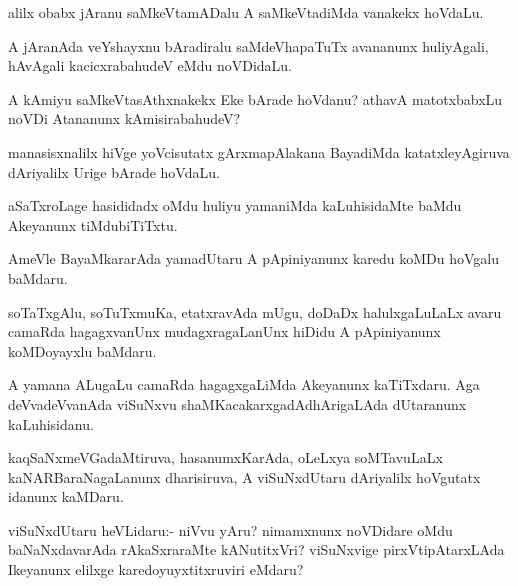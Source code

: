 \begin{mng}
alilx obabx jAranu saMkeVtamADalu A saMkeVtadiMda vanakekx hoVdaLu.
\end{mng}

\begin{mng}
A jAranAda veYshayxnu bAradiralu saMdeVhapaTuTx avananunx huliyAgali, hAvAgali kacicxrabahudeV eMdu noVDidaLu.
\end{mng}

\begin{mng}
A kAmiyu saMkeVtasAthxnakekx Eke bArade hoVdanu? athavA matotxbabxLu noVDi Atananunx kAmisirabahudeV?
\end{mng}

\begin{mng}
manasisxnalilx hiVge yoVcisutatx gArxmapAlakana BayadiMda katatxleyAgiruva dAriyalilx Urige bArade hoVdaLu.
\end{mng}

\begin{mng}
aSaTxroLage hasididadx oMdu huliyu yamaniMda kaLuhisidaMte baMdu Akeyanunx tiMdubiTiTxtu.
\end{mng}

\begin{mng}
AmeVle BayaMkararAda yamadUtaru A pApiniyanunx karedu koMDu hoVgalu baMdaru.
\end{mng}

\begin{mng}
soTaTxgAlu, soTuTxmuKa, etatxravAda mUgu, doDaDx halulxgaLuLaLx avaru camaRda hagagxvanUnx mudagxragaLanUnx hiDidu A pApiniyanunx koMDoyayxlu baMdaru.
\end{mng}

\begin{mng}
A yamana ALugaLu camaRda hagagxgaLiMda Akeyanunx kaTiTxdaru. Aga deVvadeVvanAda viSuNxvu shaMKacakarxgadAdhArigaLAda dUtaranunx kaLuhisidanu.
\end{mng}

\begin{mng}
kaqSaNxmeVGadaMtiruva, hasanumxKarAda, oLeLxya soMTavuLaLx kaNARBaraNagaLanunx dharisiruva, A viSuNxdUtaru dAriyalilx hoVgutatx idanunx kaMDaru.
\end{mng}

\begin{mng}
viSuNxdUtaru heVLidaru:- niVvu yAru? nimamxnunx noVDidare oMdu baNaNxdavarAda rAkaSxraraMte kANutitxVri? viSuNxvige pirxVtipAtarxLAda Ikeyanunx elilxge karedoyuyxtitxruviri eMdaru?
\end{mng}

